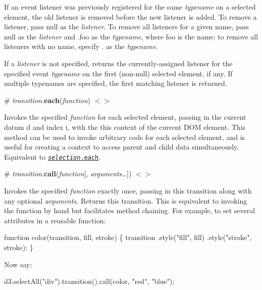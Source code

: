 If an event listener was previously registered for the same {\itshape typename} on a selected element, the old listener is removed before the new listener is added. To remove a listener, pass null as the {\itshape listener}. To remove all listeners for a given name, pass null as the {\itshape listener} and {\ttfamily .foo} as the {\itshape typename}, where {\ttfamily foo} is the name; to remove all listeners with no name, specify {\ttfamily .} as the {\itshape typename}.

If a {\itshape listener} is not specified, returns the currently-\/assigned listener for the specified event {\itshape typename} on the first (non-\/null) selected element, if any. If multiple typenames are specified, the first matching listener is returned.

\label{_transition_each}%
\# {\itshape transition}.{\bfseries each}({\itshape function}) \href{https://github.com/d3/d3-selection/blob/master/src/selection/each.js}{\tt $<$$>$}

Invokes the specified {\itshape function} for each selected element, passing in the current datum {\ttfamily d} and index {\ttfamily i}, with the {\ttfamily this} context of the current D\+OM element. This method can be used to invoke arbitrary code for each selected element, and is useful for creating a context to access parent and child data simultaneously. Equivalent to \href{https://github.com/d3/d3-selection#selection_each}{\tt {\itshape selection}.each}.

\label{_transition_call}%
\# {\itshape transition}.{\bfseries call}({\itshape function}\mbox{[}, {\itshape arguments…}\mbox{]}) \href{https://github.com/d3/d3-selection/blob/master/src/selection/call.js}{\tt $<$$>$}

Invokes the specified {\itshape function} exactly once, passing in this transition along with any optional {\itshape arguments}. Returns this transition. This is equivalent to invoking the function by hand but facilitates method chaining. For example, to set several attributes in a reusable function\+:


\begin{DoxyCode}
function color(transition, fill, stroke) \{
  transition
      .style("fill", fill)
      .style("stroke", stroke);
\}
\end{DoxyCode}


Now say\+:


\begin{DoxyCode}
d3.selectAll("div").transition().call(color, "red", "blue");
\end{DoxyCode}


